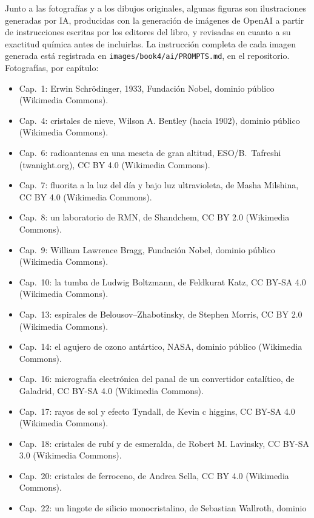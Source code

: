 \bigskip
Junto a las fotografías y a los dibujos originales, algunas figuras son
ilustraciones generadas por IA, producidas con la generación de imágenes
de OpenAI a partir de instrucciones escritas por los editores del libro,
y revisadas en cuanto a su exactitud química antes de incluirlas. La
instrucción completa de cada imagen generada está registrada en
\texttt{images/book4/ai/PROMPTS.md}, en el repositorio.
\bigskip
\noindent Fotografías, por capítulo:
\begin{itemize}\small
  \item Cap.~1: Erwin Schr\"odinger, 1933, Fundación Nobel, dominio público
        (Wikimedia Commons).
  \item Cap.~4: cristales de nieve, Wilson A. Bentley (hacia 1902), dominio público
        (Wikimedia Commons).
  \item Cap.~6: radioantenas en una meseta de gran altitud, ESO/B.~Tafreshi
        (twanight.org), CC BY 4.0 (Wikimedia Commons).
  \item Cap.~7: fluorita a la luz del día y bajo luz ultravioleta, de Masha
        Milshina, CC BY 4.0 (Wikimedia Commons).
  \item Cap.~8: un laboratorio de RMN, de Shandchem, CC BY 2.0 (Wikimedia
        Commons).
  \item Cap.~9: William Lawrence Bragg, Fundación Nobel, dominio público
        (Wikimedia Commons).
  \item Cap.~10: la tumba de Ludwig Boltzmann, de Feldkurat Katz,
        CC BY-SA 4.0 (Wikimedia Commons).
  \item Cap.~13: espirales de Belousov--Zhabotinsky, de Stephen Morris, CC BY 2.0
        (Wikimedia Commons).
  \item Cap.~14: el agujero de ozono antártico, NASA, dominio público (Wikimedia
        Commons).
  \item Cap.~16: micrografía electrónica del panal de un convertidor catalítico, de
        Galadrid, CC BY-SA 4.0 (Wikimedia Commons).
  \item Cap.~17: rayos de sol y efecto Tyndall, de Kevin c higgins, CC BY-SA 4.0
        (Wikimedia Commons).
  \item Cap.~18: cristales de rubí y de esmeralda, de Robert M. Lavinsky, CC BY-SA 3.0
        (Wikimedia Commons).
  \item Cap.~20: cristales de ferroceno, de Andrea Sella, CC BY 4.0 (Wikimedia
        Commons).
  \item Cap.~22: un lingote de silicio monocristalino, de Sebastian Wallroth, dominio

\end{itemize}
